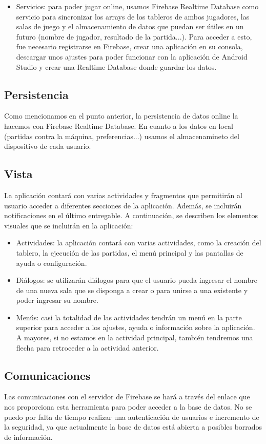 \documentclass[a4paper, openright, 12pt]{article}
\begin{document}
\begin{itemize}
\begin{enumerate}
        \end{enumerate}
    \item Servicios: para poder jugar online, usamos Firebase Realtime Database como servicio para sincronizar los arrays de los tableros de ambos jugadores, las salas de juego y el almacenamiento de datos que puedan ser útiles en un futuro (nombre de jugador, resultado de la partida...). Para acceder a esto, fue necesario registrarse en Firebase, crear una aplicación en su consola, descargar unos ajustes para poder funcionar con la aplicación de Android Studio y crear una Realtime Database donde guardar los datos.
\end{itemize}

\subsection{Persistencia}
Como mencionamos en el punto anterior, la persistencia de datos online la hacemos con Firebase Realtime Database. En cuanto a los datos en local (partidas contra la máquina, preferencias...) usamos el almacenamineto del dispositivo de cada usuario.

\subsection{Vista}
La aplicación contará con varias actividades y fragmentos que permitirán al usuario acceder a diferentes secciones de la aplicación. Además, se incluirán notificaciones en el último entregable. A continuación, se describen los elementos visuales que se incluirán en la aplicación:
\begin{itemize}
    \item Actividades: la aplicación contará con varias actividades, como la creación del tablero, la ejecución de las partidas, el menú principal y las pantallas de ayuda o configuración.
    \item Diálogos: se utilizarán diálogos para que el usuario pueda ingresar el nombre de una nueva sala que se disponga a crear o para unirse a una existente y poder ingresar su nombre.
    \item Menús: casi la totalidad de las actividades tendrán un menú en la parte superior para acceder a los ajustes, ayuda o información sobre la aplicación. A mayores, si no estamos en la actividad principal, también tendremos una flecha para retroceder a la actividad anterior.
\end{itemize}

\subsection{Comunicaciones}
Las comunicaciones con el servidor de Firebase se hará a través del enlace que nos proporciona esta herramienta para poder acceder a la base de datos. No se puedo por falta de tiempo realizar una autenticación de usuarios e incremento de la seguridad, ya que actualmente la base de datos está abierta a posibles borrados de información.
\end{document}
